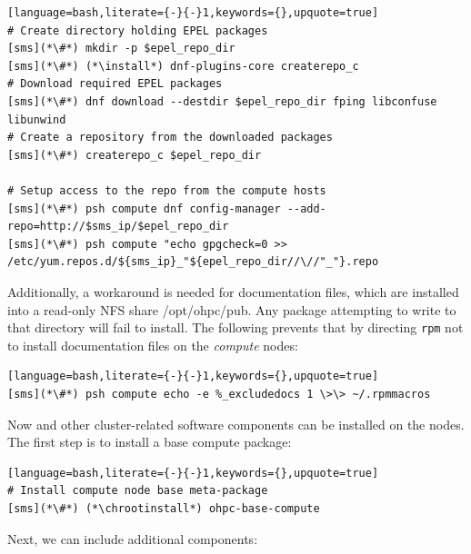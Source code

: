 \begin{lstlisting}[language=bash,literate={-}{-}1,keywords={},upquote=true]
# Create directory holding EPEL packages
[sms](*\#*) mkdir -p $epel_repo_dir
[sms](*\#*) (*\install*) dnf-plugins-core createrepo_c
# Download required EPEL packages
[sms](*\#*) dnf download --destdir $epel_repo_dir fping libconfuse libunwind
# Create a repository from the downloaded packages
[sms](*\#*) createrepo_c $epel_repo_dir

# Setup access to the repo from the compute hosts
[sms](*\#*) psh compute dnf config-manager --add-repo=http://$sms_ip/$epel_repo_dir
[sms](*\#*) psh compute "echo gpgcheck=0 >> /etc/yum.repos.d/${sms_ip}_"${epel_repo_dir//\//"_"}.repo
\end{lstlisting}


\noindent Additionally, a workaround is needed for \OHPC{} documentation files,
which are installed into a read-only NFS share /opt/ohpc/pub. Any package
attempting to write to that directory will fail to install. The following
prevents that by directing \texttt{rpm} not to install documentation files on
the {\em compute} nodes:

\begin{lstlisting}[language=bash,literate={-}{-}1,keywords={},upquote=true]
[sms](*\#*) psh compute echo -e %_excludedocs 1 \>\> ~/.rpmmacros
\end{lstlisting}

\noindent Now \OHPC{} and other cluster-related software components can be
installed on the nodes. The first step is to install a base compute package:
\begin{lstlisting}[language=bash,literate={-}{-}1,keywords={},upquote=true]
# Install compute node base meta-package
[sms](*\#*) (*\chrootinstall*) ohpc-base-compute
\end{lstlisting}

\noindent Next, we can include additional components:
